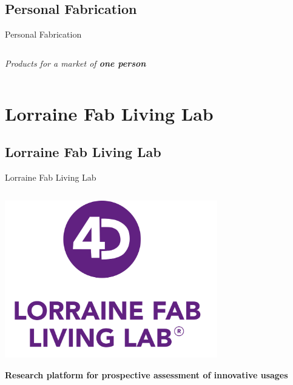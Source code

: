 \documentclass[
  ignorenonframetext,
  aspectratio=169,
  c]{beamer}
\begin{document}
\subsection{Personal Fabrication}\label{personal-fabrication}

\begin{frame}{Personal Fabrication}
\begin{columns}[T]
\begin{column}{0.48\textwidth}
\emph{Products for a market of \textbf{one person}}
\end{column}

\begin{column}{0.48\textwidth}
\end{column}
\end{columns}
\end{frame}

\section{Lorraine Fab Living Lab}\label{lorraine-fab-living-lab}

\subsection{Lorraine Fab Living Lab}\label{lorraine-fab-living-lab-1}

\begin{frame}{Lorraine Fab Living Lab}
\begin{columns}[T]
\begin{column}{0.48\textwidth}
\begin{center}
\includegraphics[width=3.64583in,height=\textheight]{figures/LF2L-Vertical.jpg}
\end{center}

\textbf{Research platform for prospective assessment of innovative
usages}
\end{column}

\begin{column}{0.48\textwidth}
\end{column}
\end{columns}
\end{frame}
\end{document}
